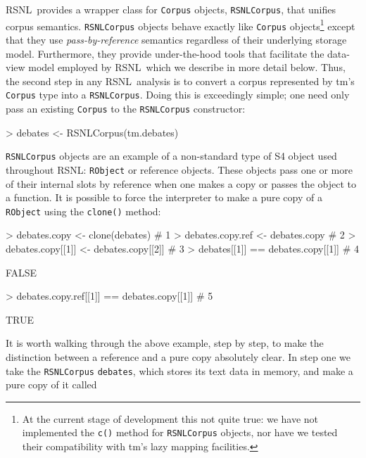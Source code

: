 \documentclass[11pt]{article}
\def\RSNL{{\normalfont\fontseries{b}\selectfont RSNL}}
\def\tm{{\normalfont\fontseries{b}\selectfont tm}}
\let\code=\texttt
\let\rclass=\texttt
\begin{document}
\RSNL\ provides a wrapper class for \rclass{Corpus} objects,
\rclass{RSNLCorpus}, that unifies corpus semantics.
\rclass{RSNLCorpus}
objects behave exactly like \rclass{Corpus} objects\footnote{At the
current stage of development this not quite true: we have not
implemented the \code{c()} method for \rclass{RSNLCorpus} objects, nor
have we tested their compatibility with \tm's lazy mapping
facilities.} except that they use \emph{pass-by-reference} semantics
regardless of their underlying storage model.  Furthermore, they
provide under-the-hood tools that facilitate the data-view model
employed by \RSNL\, which we describe in more detail below.  Thus, the
second step in any \RSNL\ analysis is to convert a corpus represented
by \tm's \rclass{Corpus} type into a \rclass{RSNLCorpus}.  Doing this is
exceedingly simple; one need only pass an existing \rclass{Corpus} to
the \rclass{RSNLCorpus} constructor:
\begin{Schunk}
\begin{Sinput}
> debates <- RSNLCorpus(tm.debates)
\end{Sinput}
\end{Schunk}
\rclass{RSNLCorpus} objects are an example of a non-standard type of S4
object used throughout \RSNL: \rclass{RObject} or reference objects.
These objects pass one or more of their internal slots by reference
when one makes a copy or passes the object to a function.  It is
possible to force the interpreter to make a pure copy of a
\rclass{RObject} using the \code{clone()} method:
\begin{Schunk}
\begin{Sinput}
> debates.copy <- clone(debates)              # 1
> debates.copy.ref <- debates.copy            # 2
> debates.copy[[1]] <- debates.copy[[2]]      # 3
> debates[[1]] == debates.copy[[1]]           # 4
\end{Sinput}
\begin{Soutput}
[1] FALSE
\end{Soutput}
\begin{Sinput}
> debates.copy.ref[[1]] == debates.copy[[1]]  # 5
\end{Sinput}
\begin{Soutput}
[1] TRUE
\end{Soutput}
\end{Schunk}
It is worth walking through the above example, step by step, to
make the distinction between a reference and a pure copy absolutely
clear.  In step one we take the \rclass{RSNLCorpus} \code{debates}, which
stores its text data in memory, and make a pure copy of it called
\end{document}
